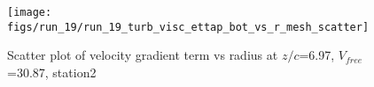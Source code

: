 \begin{figure}[H]
\centering
\texttt{[image: figs/run\_19/run\_19\_turb\_visc\_ettap\_bot\_vs\_r\_mesh\_scatter]}
\caption{Scatter plot of velocity gradient term vs radius at $z/c$=6.97, $V_{free}$=30.87, station2}
\label{fig:run_19_turb_visc_ettap_bot_vs_r_mesh_scatter}
\end{figure}


